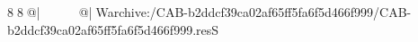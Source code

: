 8  8  @|                                                   @| W   archive:/CAB-b2ddcf39ca02af65ff5fa6f5d466f999/CAB-b2ddcf39ca02af65ff5fa6f5d466f999.resS 
